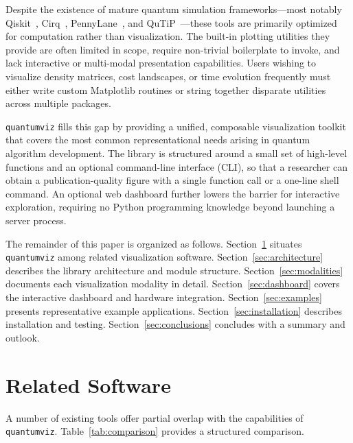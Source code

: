 \documentclass{SciPost}
\begin{document}
Despite the existence of mature quantum simulation frameworks---most notably
Qiskit~\cite{Qiskit2023}, Cirq~\cite{Cirq2024},
PennyLane~\cite{Bergholm2018}, and QuTiP~\cite{Johansson2012}---these tools
are primarily optimized for computation rather than visualization.
The built-in plotting utilities they provide are often limited in scope,
require non-trivial boilerplate to invoke, and lack interactive or multi-modal
presentation capabilities.
Users wishing to visualize density matrices, cost landscapes, or time
evolution frequently must either write custom Matplotlib routines or string
together disparate utilities across multiple packages.

\texttt{quantumviz} fills this gap by providing a unified, composable
visualization toolkit that covers the most common representational needs
arising in quantum algorithm development.
The library is structured around a small set of high-level functions and an
optional command-line interface (CLI), so that a researcher can obtain a
publication-quality figure with a single function call or a one-line shell
command.
An optional web dashboard further lowers the barrier for interactive
exploration, requiring no Python programming knowledge beyond launching a
server process.

The remainder of this paper is organized as follows.
Section~\ref{sec:related} situates \texttt{quantumviz} among related
visualization software.
Section~\ref{sec:architecture} describes the library architecture and module
structure.
Section~\ref{sec:modalities} documents each visualization modality in detail.
Section~\ref{sec:dashboard} covers the interactive dashboard and hardware
integration.
Section~\ref{sec:examples} presents representative example applications.
Section~\ref{sec:installation} describes installation and testing.
Section~\ref{sec:conclusions} concludes with a summary and outlook.

\section{Related Software}
\label{sec:related}

A number of existing tools offer partial overlap with the capabilities of
\texttt{quantumviz}.
Table~\ref{tab:comparison} provides a structured comparison.
\end{document}
